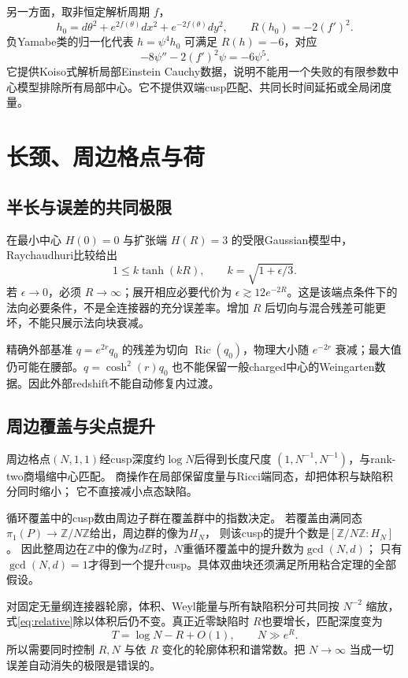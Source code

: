 \documentclass[UTF8,a4paper,11pt,fontset=fandol]{ctexart}
\numberwithin{equation}{section}
\theoremstyle{definition}
\newcommand{\Ric}{\operatorname{Ric}}
\newcommand{\Z}{\mathbb Z}
\begin{document}
另一方面，取非恒定解析周期 $f$，
\[
h_0=d\theta^2+e^{2f(\theta)}dx^2+e^{-2f(\theta)}dy^2,
\qquad R(h_0)=-2(f')^2.
\]
负Yamabe类的归一化代表 $h=\psi^4h_0$ 可满足 $R(h)=-6$，对应
\[
-8\psi''-2(f')^2\psi=-6\psi^5.
\]
它提供Koiso式解析局部Einstein Cauchy数据，说明不能用一个失败的有限参数中心模型排除所有局部中心。它不提供双端cusp匹配、共同长时间延拓或全局闭度量。

\section{长颈、周边格点与荷}
\subsection{半长与误差的共同极限}
在最小中心 $H(0)=0$ 与扩张端 $H(R)=3$ 的受限Gaussian模型中，Raychaudhuri比较给出
\[
1\le k\tanh(kR),\qquad k=\sqrt{1+\epsilon/3}.
\]
若 $\epsilon\to0$，必须 $R\to\infty$；展开相应必要代价为 $\epsilon\gtrsim12e^{-2R}$。这是该端点条件下的法向必要条件，不是全连接器的充分误差率。增加 $R$ 后切向与混合残差可能更坏，不能只展示法向块衰减。

精确外部基准 $q=e^{2r}q_0$ 的残差为切向 $\Ric(q_0)$，物理大小随 $e^{-2r}$ 衰减；最大值仍可能在腰部。$q=\cosh^2(r)q_0$ 也不能保留一般charged中心的Weingarten数据。因此外部redshift不能自动修复内过渡。

\subsection{周边覆盖与尖点提升}
周边格点$(N,1,1)$经cusp深度约$\log N$后得到长度尺度
$(1,N^{-1},N^{-1})$，与rank-two商塌缩中心匹配。
商操作在局部保留度量与Ricci端同态，却把体积与缺陷积分同时缩小；
它不直接减小点态缺陷。

循环覆盖中的cusp数由周边子群在覆盖群中的指数决定。
若覆盖由满同态$\pi_1(P)\to\Z/N\Z$给出，周边群的像为$H_N$，
则该cusp的提升个数是$[\Z/N\Z:H_N]$。
因此整周边在$\Z$中的像为$d\Z$时，$N$重循环覆盖中的提升数为$\gcd(N,d)$；
只有$\gcd(N,d)=1$才得到一个提升cusp。具体双曲块还须满足所用粘合定理的全部假设。

对固定无量纲连接器轮廓，体积、Weyl能量与所有缺陷积分可共同按 $N^{-2}$ 缩放，式\eqref{eq:relative}除以体积后仍不变。真正近零缺陷时 $R$也要增长，匹配深度变为
\begin{equation}\label{eq:RN}
T=\log N-R+O(1),\qquad N\gg e^R.
\end{equation}
所以需要同时控制 $R,N$ 与依 $R$ 变化的轮廓体积和谱常数。把 $N\to\infty$ 当成一切误差自动消失的极限是错误的。
\end{document}
